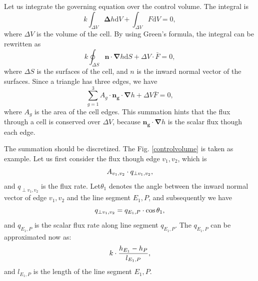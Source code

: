 \documentclass{article}        %
\begin{document}
Let us integrate the governing equation over the control volume. The integral is 
\begin{equation}
	k\int_{\Delta V} \bm{\Delta} h \mathrm{d}V + \int_{\Delta V} F \mathrm{d}V = 0,
\end{equation}
where $\Delta V$ is the volume of the cell. By using Green's formula, the integral can be rewritten as
\begin{equation}
k\oint_{\Delta S} \bm{n} \cdot \bm{\nabla} h \mathrm{d}S + \Delta V \cdot \bar{F} = 0,
\end{equation}
where $\Delta S$ is the surfaces of the cell, and $n$ is the inward normal vector of the surfaces. Since a triangle has three edges, we have
\begin{equation}
	\sum_{g = 1}^{3} A_g \cdot \bm{n_g} \cdot \bm{\nabla}h +\Delta V \bar{F} = 0, 
	\label{summation_flux}
\end{equation}
where $A_g$ is the area of the cell edges. This summation hints that the flux through a cell is conserved over $\Delta V$, because $\bm{n_g} \cdot \bm{\nabla}h$ is the scalar flux though each edge.

The summation should be discretized. The Fig. \ref{controlvolume} is taken as example. Let us first consider the flux though edge $v_1, v_2$, which is 
\begin{equation}
 A_{v_1,v_2} \cdot q_{\perp v_1,v_2}, \notag
\end{equation}
and $q_{\perp v_1,v_2}$ is the flux rate. Let$\theta_1$ denotes the angle between the inward normal vector of edge $v_1,v_2$ and the line segment $E_1, P$, and subsequently we have
\begin{equation}
	q_{\perp v_1,v_2} = q_{E_1, P} \cdot \cos{\theta_1},\notag
\end{equation}
and $q_{E_1, P}$ is the scalar flux rate along line segment $q_{E_1, P}$. The $q_{E_1, P}$ can be approximated now as:
\begin{equation}
	k\cdot \frac{h_{E_1} - h_{P}}{l_{E_1, P}}, \notag
\end{equation}
and $l_{E_1, P}$ is the length of the line segment $E_1, P$.
\end{document}

